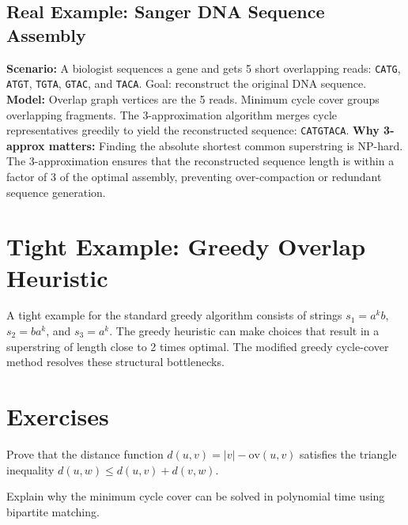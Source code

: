 \subsection*{Real Example: Sanger DNA Sequence Assembly}
\textbf{Scenario:} A biologist sequences a gene and gets 5 short overlapping reads: \texttt{CATG}, \texttt{ATGT}, \texttt{TGTA}, \texttt{GTAC}, and \texttt{TACA}. Goal: reconstruct the original DNA sequence.
\textbf{Model:} Overlap graph vertices are the 5 reads. Minimum cycle cover groups overlapping fragments. The 3-approximation algorithm merges cycle representatives greedily to yield the reconstructed sequence: \texttt{CATGTACA}.
\textbf{Why 3-approx matters:} Finding the absolute shortest common superstring is NP-hard. The 3-approximation ensures that the reconstructed sequence length is within a factor of 3 of the optimal assembly, preventing over-compaction or redundant sequence generation.

\section{Tight Example: Greedy Overlap Heuristic}
A tight example for the standard greedy algorithm consists of strings $s_1 = a^k b$, $s_2 = b a^k$, and $s_3 = a^k$. The greedy heuristic can make choices that result in a superstring of length close to 2 times optimal. The modified greedy cycle-cover method resolves these structural bottlenecks.

\section{Exercises}
\begin{exercise}
Prove that the distance function $d(u, v) = |v| - \text{ov}(u, v)$ satisfies the triangle inequality $d(u, w) \le d(u, v) + d(v, w)$.
\end{exercise}
\begin{exercise}
Explain why the minimum cycle cover can be solved in polynomial time using bipartite matching.
\end{exercise}


